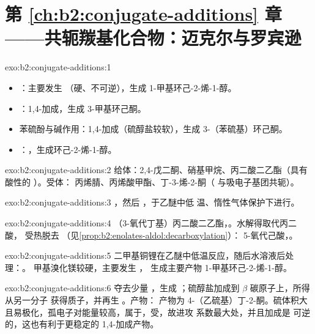 \section*{第 \ref{ch:b2:conjugate-additions} 章——共轭羰基化合物：迈克尔与罗宾逊}

\begin{solution}{exo:b2:conjugate-additions:1}
\begin{itemize}
  \item {}：主要发生 （硬、不可逆），生成 1-甲基环己-2-烯-1-醇。
  \item {}：1,4-加成，生成 3-甲基环己酮。
  \item 苯硫酚与碱作用：1,4-加成（硫醇盐较软），生成 3-（苯硫基）环己酮。
  \item {}：，生成环己-2-烯-1-醇。
\end{itemize}
\end{solution}

\begin{solution}{exo:b2:conjugate-additions:2}
给体：2,4-戊二酮、硝基甲烷、丙二酸二乙酯（具有酸性的 ）。受体：
丙烯腈、丙烯酸甲酯、丁-3-烯-2-酮（ 与吸电子基团共轭）。
\end{solution}

\begin{solution}{exo:b2:conjugate-additions:3}
，然后 ，于乙醚中低
温、惰性气体保护下进行。
\end{solution}

\begin{solution}{exo:b2:conjugate-additions:4}
（3-氧代丁基）丙二酸二乙酯，。水解得取代丙二酸，
受热脱去 （见\cref{prop:b2:enolates-aldol:decarboxylation}）：
5-氧代己酸，。
\end{solution}

\begin{solution}{exo:b2:conjugate-additions:5}
二甲基铜锂在乙醚中低温反应，随后水溶液后处理：。
甲基溴化镁较硬，主要发生 ，
生成主要产物 1-甲基环己-2-烯-1-醇。
\end{solution}

\begin{solution}{exo:b2:conjugate-additions:6}
 夺去少量 ，生成 ；硫醇盐加成到 $\beta$ 碳原子上，所得
从另一分子  获得质子，并再生 。产物：
产物为 4-（乙硫基）丁-2-酮。硫体积大且易极化，孤电子对能量较高，属于，受，故进攻  系数最大处，并且加成是
可逆的，这也有利于更稳定的 1,4-加成产物。
\end{solution}

